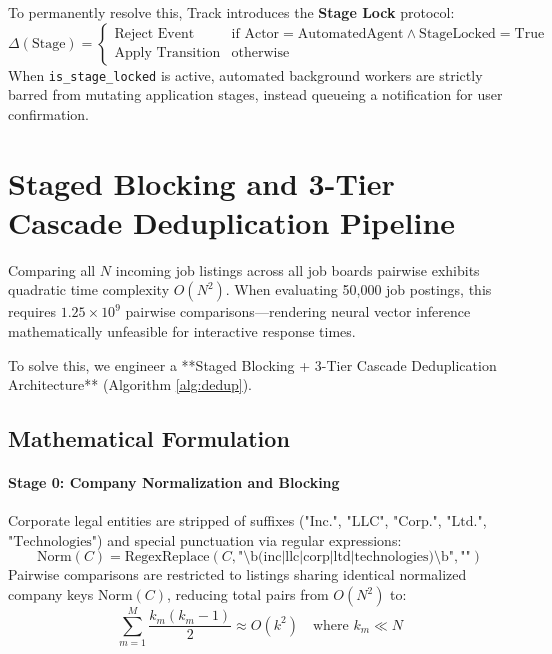To permanently resolve this, Track introduces the \textbf{Stage Lock} protocol:
\begin{equation}
    \Delta(\text{Stage}) = \begin{cases}
        \text{Reject Event} & \text{if } \text{Actor} = \text{AutomatedAgent} \land \text{StageLocked} = \text{True} \\
        \text{Apply Transition} & \text{otherwise}
    \end{cases}
\end{equation}
When \texttt{is\_stage\_locked} is active, automated background workers are strictly barred from mutating application stages, instead queueing a notification for user confirmation.

\section{Staged Blocking and 3-Tier Cascade Deduplication Pipeline}
Comparing all $N$ incoming job listings across all job boards pairwise exhibits quadratic time complexity $O(N^2)$. When evaluating 50,000 job postings, this requires $1.25 \times 10^9$ pairwise comparisons—rendering neural vector inference mathematically unfeasible for interactive response times.

To solve this, we engineer a **Staged Blocking + 3-Tier Cascade Deduplication Architecture** (Algorithm \ref{alg:dedup}).

\subsection{Mathematical Formulation}

\paragraph{Stage 0: Company Normalization and Blocking}
Corporate legal entities are stripped of suffixes ($\text{"Inc."}$, $\text{"LLC"}$, $\text{"Corp."}$, $\text{"Ltd."}$, $\text{"Technologies"}$) and special punctuation via regular expressions:
\begin{equation}
    \text{Norm}(C) = \text{RegexReplace}(C, \text{"\textbackslash b(inc|llc|corp|ltd|technologies)\textbackslash b"}, \text{""})
\end{equation}
Pairwise comparisons are restricted to listings sharing identical normalized company keys $\text{Norm}(C)$, reducing total pairs from $O(N^2)$ to:
\begin{equation}
    \sum_{m=1}^{M} \frac{k_m(k_m - 1)}{2} \approx O(k^2) \quad \text{where } k_m \ll N
\end{equation}

